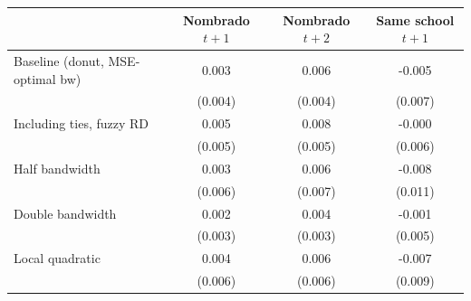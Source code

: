 \begin{tabular}{lccc}
\toprule
 & Nombrado $t+1$ & Nombrado $t+2$ & Same school $t+1$ \\
\midrule
Baseline (donut, MSE-optimal bw) & 0.003 & 0.006 & -0.005 \\
 & (0.004) & (0.004) & (0.007) \\
Including ties, fuzzy RD & 0.005 & 0.008 & -0.000 \\
 & (0.005) & (0.005) & (0.006) \\
Half bandwidth & 0.003 & 0.006 & -0.008 \\
 & (0.006) & (0.007) & (0.011) \\
Double bandwidth & 0.002 & 0.004 & -0.001 \\
 & (0.003) & (0.003) & (0.005) \\
Local quadratic & 0.004 & 0.006 & -0.007 \\
 & (0.006) & (0.006) & (0.009) \\
\bottomrule
\end{tabular}
